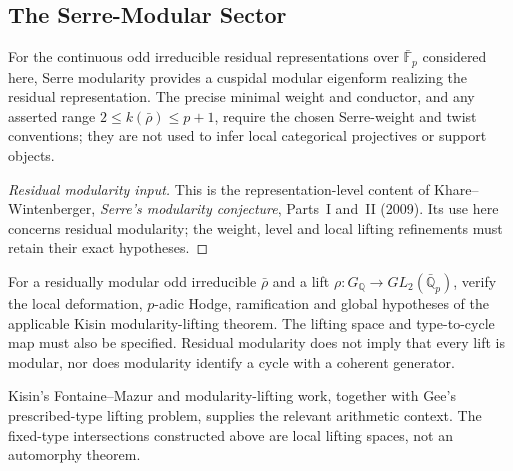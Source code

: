 \subsection{The Serre-Modular Sector}

\begin{lemma}
\label{v4-arith:w6-e:lem:KW-Serre}
For the continuous odd irreducible residual representations over
$\bar{\mathbb F}_p$ considered here, Serre modularity provides a
cuspidal modular eigenform realizing the residual representation.
The precise minimal weight and conductor, and any asserted range
$2\le k(\bar\rho)\le p+1$, require the chosen Serre-weight and
twist conventions; they are not used to infer local categorical
projectives or support objects.
\end{lemma}
\begin{proof}[Residual modularity input]
This is the representation-level content of Khare--Wintenberger,
\emph{Serre's modularity conjecture}, Parts~I and~II (2009).
Its use here concerns residual modularity; the weight, level and
local lifting refinements must retain their exact hypotheses.
\end{proof}
\begin{conjecture}
\label{v4-arith:w6-e:lem:Kisin-lifting}
For a residually modular odd irreducible $\bar\rho$ and a lift
$\rho:G_{\mathbb Q}\to GL_2(\bar{\mathbb Q}_p)$, verify the
local deformation, $p$-adic Hodge, ramification and global hypotheses
of the applicable Kisin modularity-lifting theorem. The lifting
space and type-to-cycle map must also be specified. Residual
modularity does not imply that every lift is modular, nor does
modularity identify a cycle with a coherent generator.
\end{conjecture}
Kisin's Fontaine--Mazur and modularity-lifting work, together with
Gee's prescribed-type lifting problem, supplies the relevant
arithmetic context. The fixed-type intersections constructed above
are local lifting spaces, not an automorphy theorem.

